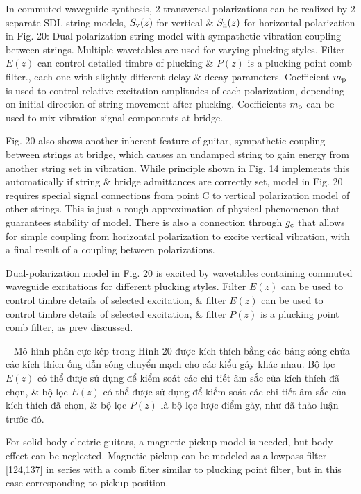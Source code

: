 \documentclass{article}
\begin{document}
\begin{itemize}
\begin{itemize}
		In commuted waveguide synthesis, 2 transversal polarizations can be realized by 2 separate SDL string models, $S_{\rm v}(z)$ for vertical \& $S_{\rm h}(z)$ for horizontal polarization in {\sf Fig. 20: Dual-polarization string model with sympathetic vibration coupling between strings. Multiple wavetables are used for varying plucking styles. Filter $E(z)$ can control detailed timbre of plucking \& $P(z)$ is a plucking point comb filter.}, each one with slightly different delay \& decay parameters. Coefficient $m_{\rm p}$ is used to control relative excitation amplitudes of each polarization, depending on initial direction of string movement after plucking. Coefficients $m_{\rm o}$ can be used to mix vibration signal components at bridge.
		
		{\sf Fig. 20} also shows another inherent feature of guitar, sympathetic coupling between strings at bridge, which causes an undamped string to gain energy from another string set in vibration. While principle shown in {\sf Fig. 14} implements this automatically if string \& bridge admittances are correctly set, model in {\sf Fig. 20} requires special signal connections from point C to vertical polarization model of other strings. This is just a rough approximation of physical phenomenon that guarantees stability of model. There is also a connection through $g_{\rm c}$ that allows for simple coupling from horizontal polarization to excite vertical vibration, with a final result of a coupling between polarizations.
		
		Dual-polarization model in {\sf Fig. 20} is excited by wavetables containing commuted waveguide excitations for different plucking styles. Filter $E(z)$ can be used to control timbre details of selected excitation, \& filter $E(z)$ can be used to control timbre details of selected excitation, \& filter $P(z)$ is a plucking point comb filter, as prev discussed.
		
		-- Mô hình phân cực kép trong {\sf Hình 20} được kích thích bằng các bảng sóng chứa các kích thích ống dẫn sóng chuyển mạch cho các kiểu gảy khác nhau. Bộ lọc $E(z)$ có thể được sử dụng để kiểm soát các chi tiết âm sắc của kích thích đã chọn, \& bộ lọc $E(z)$ có thể được sử dụng để kiểm soát các chi tiết âm sắc của kích thích đã chọn, \& bộ lọc $P(z)$ là bộ lọc lược điểm gảy, như đã thảo luận trước đó.
		
		For solid body electric guitars, a magnetic pickup model is needed, but body effect can be neglected. Magnetic pickup can be modeled as a lowpass filter [124,137] in series with a comb filter similar to plucking point filter, but in this case corresponding to pickup position.
		

\end{itemize}
\end{itemize}
\end{document}
